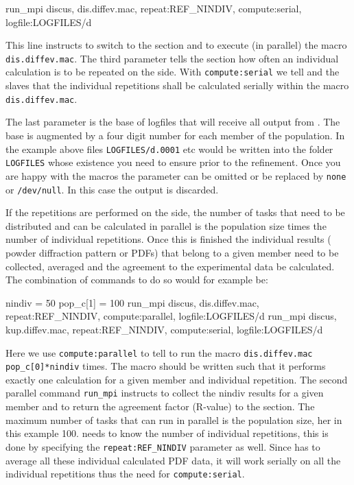 \begin{MacVerbatim}
    run_mpi discus, dis.diffev.mac, repeat:REF_NINDIV, compute:serial, logfile:LOGFILES/d
\end{MacVerbatim}

This line instructs \diffev to switch to the \Discus section and to execute 
(in parallel) the 
macro {\tt dis.diffev.mac}. The third parameter tells the \Diffev section
how often an individual calculation is to be repeated on the \Diffev side.
With {\tt compute:serial} we tell \Diffev and the \Discus slaves that the
individual repetitions shall be calculated serially within the macro
{\tt dis.diffev.mac}.

The last parameter is the base of logfiles that will receive all output from 
\Discus. The base is augmented by a four digit number for each member of the
population. In the example above files {\tt LOGFILES/d.0001} etc would be written
into the folder {\tt LOGFILES} whose existence you need to ensure prior to the
refinement. Once you are happy with the \Discus macros the parameter can be
omitted or be replaced by {\tt none} or {\tt /dev/null}. In this case the output is
discarded.

If the repetitions are performed on the \Diffev side, the number of tasks that
need to be distributed and can be calculated in parallel is the 
population size times the number of individual repetitions. Once this is 
finished the individual results ( powder diffraction pattern or PDFs) that 
belong to a given member need to be collected, averaged and the agreement 
to the experimental data be calculated. The combination of commands to do 
so would for example be:

\begin{MacVerbatim}
    nindiv   =  50
    pop_c[1] = 100
    run_mpi discus, dis.diffev.mac, repeat:REF_NINDIV, compute:parallel, logfile:LOGFILES/d
    run_mpi discus, kup.diffev.mac, repeat:REF_NINDIV, compute:serial, logfile:LOGFILES/d
\end{MacVerbatim}
Here we use {\tt compute:parallel} to tell \Diffev to run 
the \Discus macro {\tt dis.diffev.mac} 
{\tt pop\_c[0]*nindiv} times. The \Discus macro should be written 
such that it performs exactly one calculation for a given member and 
individual repetition. The second parallel command {\tt run\_mpi} 
instructs \Kuplot to collect the nindiv results for a given member
and to return the agreement factor (R-value) to the \Diffev section.
The maximum number of tasks that can run in parallel is the population
size, her in this example 100. \Kuplot needs to know the number of individual
repetitions, this is done by specifying the {\tt repeat:REF\_NINDIV}
parameter as well. Since \Kuplot has to average all these individual
calculated PDF data, it will work serially on all the individual
repetitions thus the need for {\tt compute:serial}. 


